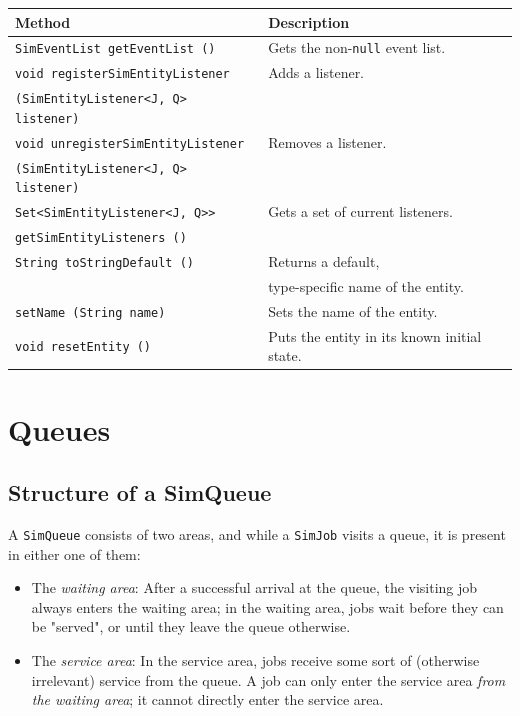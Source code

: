 \documentclass[12pt]{book}
\begin{document}
\begin{tabular}{|l|l|}
  \hline
  {\bf Method} & {\bf Description} \\
  \hline
  \lstinline[basicstyle=\footnotesize]!SimEventList getEventList ()!
    & Gets the non-\lstinline|null| event list.
    \\ \hline
  \lstinline[basicstyle=\footnotesize]!void registerSimEntityListener!
    & Adds a listener.
    \\
  \lstinline[basicstyle=\footnotesize]!(SimEntityListener<J, Q> listener)!
    & \\ \hline
  \lstinline[basicstyle=\footnotesize]!void unregisterSimEntityListener!
    & Removes a listener.
    \\
  \lstinline[basicstyle=\footnotesize]!(SimEntityListener<J, Q> listener)!
    & \\ \hline
  \lstinline[basicstyle=\footnotesize]!Set<SimEntityListener<J, Q>>!
    & Gets a set of current listeners.
    \\
  \lstinline[basicstyle=\footnotesize]!getSimEntityListeners ()!
    & \\ \hline
  \lstinline[basicstyle=\footnotesize]!String toStringDefault ()!
    & Returns a default, \\
    & type-specific name of the entity. \\ \hline
  \lstinline[basicstyle=\footnotesize]!setName (String name)!
    & Sets the name of the entity. \\ \hline
  \lstinline[basicstyle=\footnotesize]!void resetEntity ()!
    & Puts the entity in its known initial state. \\
  \hline
\end{tabular}

\section{Queues}

\subsection{Structure of a SimQueue}

A \lstinline|SimQueue| consists of two areas,
  and while a \lstinline|SimJob| visits a queue,
  it is present in either one of them:
\begin{itemize}
\item The {\em waiting area\/}: After a successful arrival at the queue,
        the visiting job always enters the waiting area;
        in the waiting area, jobs wait before they can be "served",
        or until they leave the queue otherwise.
\item The {\em service area\/}: In the service area,
        jobs receive some sort of (otherwise irrelevant) service from the queue.
      A job can only enter the service area {\em from the waiting area\/};
        it cannot directly enter the service area.
\end{itemize}
\end{document}
